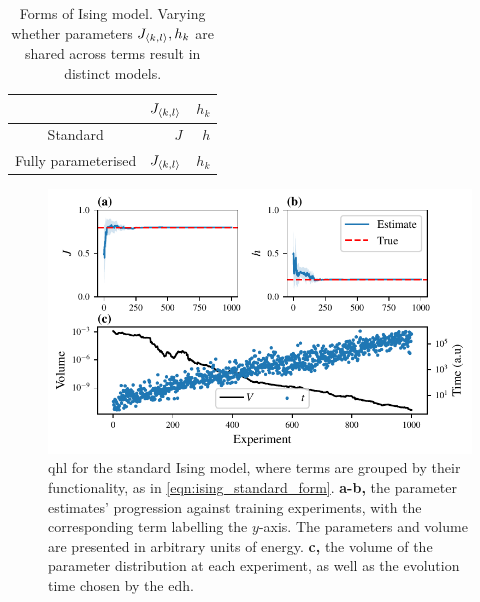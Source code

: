 \begin{table}[h]
    \begin{center}
        \begin{tabular}{crr}
             & $J_{{ \langle k, l \rangle }}$  & $h_{k}$ \\
            \hline
            Standard & $J$ & $h$ \\
            Fully parameterised & $J_{{ \langle k, l \rangle }}$ & $h_{k}$
        \end{tabular}
    \end{center}
    \caption[Forms of Ising model]{Forms of Ising model. Varying whether parameters $J_{{ \langle k, l \rangle }}, h_k$ are shared 
        across terms result in distinct models. 
    }
    \label{table:ising_models}
\end{table}

\par 

\begin{figure}[t]
    \begin{center}
        \includegraphics{theoretical_study/figures/standard_ising_qhl.pdf}
    \end{center}

    \caption[Quantum Hamiltonian learning for the standard Ising model]{
        \Acrlong{qhl} for the standard Ising model, where terms are grouped by their functionality, 
        as in \cref{eqn:ising_standard_form}. 
        \textbf{a-b,} the parameter estimates' progression against training \glspl{experiment}, 
            with the corresponding term labelling the $y$-axis. 
        The parameters and volume are presented in arbitrary units of energy. 
        \textbf{c,} the \gls{volume} of the parameter distribution at each experiment, 
            as well as the evolution time chosen by the \acrlong{edh}. 
        \figtableref
    }
    \label{fig:ising_two_param_learning}
\end{figure}

